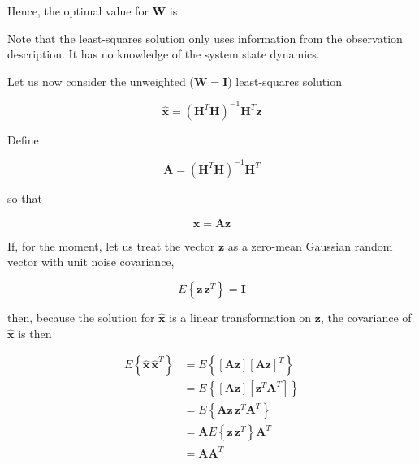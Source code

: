 Hence, the optimal value for $\mathbf{W}$ is


Note that the least-squares solution only uses information from the observation
description. It has no knowledge of the system state dynamics.

Let us now consider the unweighted ($\mathbf{W} = \mathbf{I}$) least-squares solution

\begin{equation*}
    \hat{\mathbf{x}} = \left( \mathbf{H}^T \mathbf{H} \right)^{-1} \mathbf{H}^T \mathbf{z}
\end{equation*}

Define

\begin{equation*}
    \mathbf{A} = \left( \mathbf{H}^T \mathbf{H} \right)^{-1} \mathbf{H}^T
\end{equation*}

so that

\begin{equation*}
    \hat{\mathbf{x}} = \mathbf{A} \mathbf{z}
\end{equation*}

If, for the moment, let us treat the vector $\mathbf{z}$ as a zero-mean Gaussian random
vector with unit noise covariance,

\begin{equation*}
    E \left\{ \mathbf{z} \, \mathbf{z}^T \right\} = \mathbf{I}
\end{equation*}

then, because the solution for $\hat{\mathbf{x}}$ is a linear transformation on
$\mathbf{z}$, the covariance of $\hat{\mathbf{x}}$ is then

\begin{equation*}
    \begin{aligned}
        E \left\{ \hat{\mathbf{x}} \, \hat{\mathbf{x}}^T \right\} &= E \left\{ \left[ \mathbf{A} \mathbf{z} \right] \left[ \mathbf{A} \mathbf{z} \right]^T \right\} \\
        &= E \left\{ \left[ \mathbf{A} \mathbf{z} \right] \left[ \mathbf{z}^T \mathbf{A}^T \right] \right\} \\
        &= E \left\{ \mathbf{A} \mathbf{z} \, \mathbf{z}^T \mathbf{A}^T \right\} \\
        &= \mathbf{A} E \left\{ \mathbf{z} \, \mathbf{z}^T \right\} \mathbf{A}^T \\
        &= \mathbf{A} \mathbf{A}^T
    \end{aligned}
\end{equation*}

